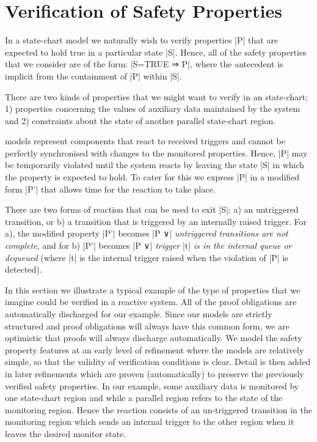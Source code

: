 

\section{Verification of Safety Properties}

In a state-chart model we naturally wish to verify properties |P| that are expected to hold true in a particular state |S|.
Hence, all of the safety properties that we consider are of the form: |S=TRUE ⇒ P|, where the antecedent is implicit from the containment of |P| within |S|.

There are two kinds of properties that we might want to verify in an \SCXML state-chart;
1) properties concerning the values of auxiliary data maintained by the system and 
2) constraints about the state of another parallel state-chart region.

\SCXML models represent components that react to received triggers and cannot be perfectly synchronised with changes to the monitored properties. 
Hence, |P| may be temporarily violated until the system reacts by leaving the state |S| in which the property is expected to hold.
To cater for this we express |P| in a modified form |P'| that allows time for the reaction to take place.

There are two forms of reaction that can be used to exit |S|; 
a) an untriggered transition, or 
b) a transition that is triggered by an internally raised trigger.
For a), the modified property |P'| becomes |P ∨| \emph{untriggered transitions are not complete}, 
and for b) |P'| becomes |P ∨| \emph{trigger} |t| \emph{is in the internal queue or dequeued}
(where |t| is the internal trigger raised when the violation of |P| is detected).


In this section we illustrate a typical example of the type of properties that we imagine could be verified in a reactive \SCXML system.
All of the proof obligations are automatically discharged for our example.
Since our models are strictly structured and proof obligations will always have this common form, we are optimistic that proofs will always discharge automatically.
We model the safety property features at an early level of refinement where the models are relatively simple, so that the validity of verification conditions is clear. 
Detail is then added in later refinements which are proven (automatically) to preserve the previously verified safety properties.
In our example, some auxiliary data is monitored by one state-chart region and while a parallel region refers to the state of the monitoring region. 
Hence the reaction consists of an un-triggered transition in the monitoring region which sends an internal trigger to the other region when it leaves the desired monitor state.

